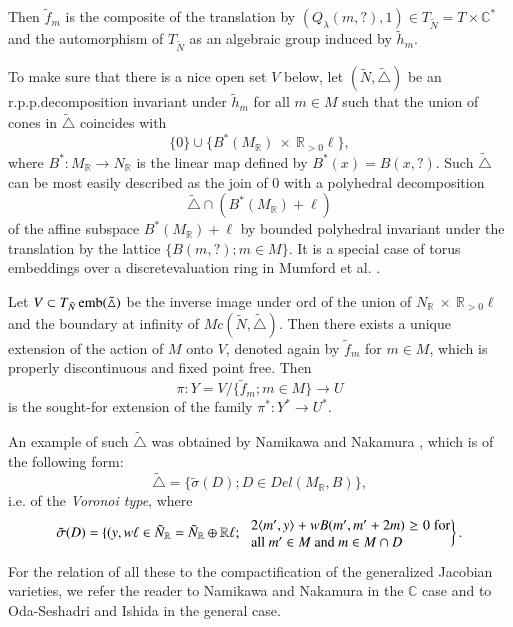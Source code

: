 Then $\tilde{f}_m$ is the composite of the translation by
$(Q_\lambda(m,?),1) \in T_{\tilde{N}} = T \times\mathbb{C}^*$ and the
automorphism of $T_{\tilde{N}}$ as an algebraic group induced by
$\tilde{h}_m$. 

To make sure that there is a nice open set $V$ below, let
$(\tilde{N},\tilde{\triangle})$ be an r.p.p.decomposition
invariant under $\tilde{h}_m$ for all $m \in M$ such that the union of
cones in $\tilde{\triangle}$ coincides with  
$$
\{0 \} \cup \{ B^* (M_\mathbb{R})~ \times~ \mathbb{R}_{>0}\ell \},
$$
where $B^* : M_{\mathbb{R}} \rightarrow N_{\mathbb{R}}$ is the linear
map defined by $B^*(x) = B(x,?)$. Such $\tilde{\triangle}$ can be most
easily described as the join of 0 with a polyhedral decomposition  
$$ 
\tilde{\triangle}\cap (B^*(M_{\mathbb{R}}) + \ell)
$$
of the affine subspace $B^*(M_{\mathbb{R}}) + \ell$ by bounded polyhedral
invariant under the translation by the lattice $\{B(m,?) ; m \in
M\}$. It is a special case of torus embeddings over a
discrete\pageoriginale valuation ring in 
Mumford et al. \cite[Chap.IV,   \S. 3]{keyTE}.  

Let $V \subset T_{\tilde{N}} \operatorname{emb} (\tilde{\triangle})$ be the inverse
image under ord of the union of $N_{\mathbb{R}}~ \times~
\mathbb{R}_{>0}\ell$ and the boundary 
at infinity of $Mc(\tilde{N},\tilde{\triangle})$. Then there exists a
unique extension of the action of $M$ onto $V$, denoted again by
$\tilde{f}_m$ for $m \in M$, which is properly discontinuous and fixed
point free. Then 
$$
\pi : Y = V/\{\tilde{f}_m ; m\in M\}\rightarrow U
$$
is the sought-for extension of the family $\pi^* : Y^* \rightarrow
U^*$. 

An example of such $\tilde{\triangle}$ was obtained by Namikawa \cite{keyN5}
and Nakamura \cite{keyN3}, which is of the following form: 
$$
\tilde{\triangle} = \{\tilde{\sigma}(D) ; D \in Del (M_{\mathbb{R}},B)\}, 
$$
i.e. of the \textit{Voronoi type}, where
$$
\tilde{\sigma}(D) = \{(y, w\ell \in \tilde{N}_{\mathbb{R}} =
\tilde{N}_{\mathbb{R}}\oplus 
\mathbb{R}\ell ; \;\; 
\left. \begin{minipage}{5cm}{
 $2 \langle m' , y \rangle + wB(m',m' +2m) \ge 0$
  for all  $m' \in M$ and $m \in M \cap D$}
\end{minipage}\right\}.
$$
 
For the relation of all these to the compactification of the
generalized Jacobian varieties, we refer the reader to Namikawa
\cite[\S.18]{keyN5} and Nakamura \cite{keyN3} in the $\mathbb{C}$ case and to
Oda-Seshadri \cite{keyOS} and Ishida \cite{keyI5} in the general case. 

